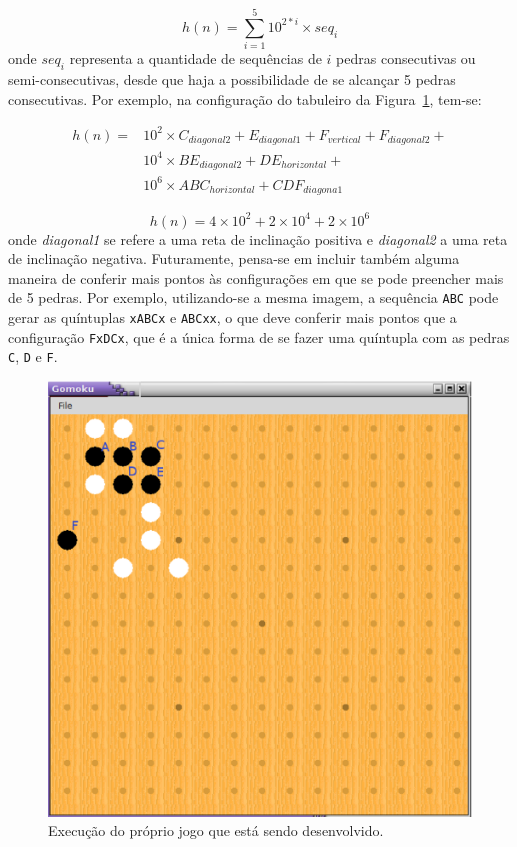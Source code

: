 \documentclass[10pt,a4paper]{article}
\begin{document}
\begin{equation}
h(n) = \sum_{i=1}^{5} 10^{2*i} \times seq_i
\end{equation}
%
onde $seq_i$ representa a quantidade de sequências de $i$ pedras consecutivas ou semi-consecutivas, desde que haja a possibilidade de se alcançar 5 pedras consecutivas. Por exemplo, na configuração do tabuleiro da Figura~\ref{fig:heuristic}, tem-se:

\begin{equation}
\begin{split}
h(n) = &10^2 \times {C_{diagonal2} + E_{diagonal1} + F_{vertical} + F_{diagonal2}} + \\
       &10^4 \times {BE_{diagonal2} + DE_{horizontal}} + \\
       &10^6 \times {ABC_{horizontal} + CDF_{diagona1}}
\end{split}
\end{equation}

\begin{equation}
h(n) =  4 \times 10^2 + 2 \times 10^4 + 2 \times 10^6
\end{equation}
%
onde \emph{diagonal1} se refere a uma reta de inclinação positiva e \emph{diagonal2} a uma reta de inclinação negativa. Futuramente, pensa-se em incluir também alguma maneira de conferir mais pontos às configurações em que se pode preencher mais de 5 pedras. Por exemplo, utilizando-se a mesma imagem, a sequência \texttt{ABC} pode gerar as quíntuplas \texttt{xABCx} e \texttt{ABCxx}, o que deve conferir mais pontos que a configuração \texttt{FxDCx}, que é a única forma de se fazer uma quíntupla com as pedras \texttt{C}, \texttt{D} e \texttt{F}.

\begin{figure}[!htbp]
    \centering
        \includegraphics[scale=0.5]{heuristic}
    \caption{Execução do próprio jogo que está sendo desenvolvido.}
    \label{fig:heuristic}
\end{figure}
\end{document}
